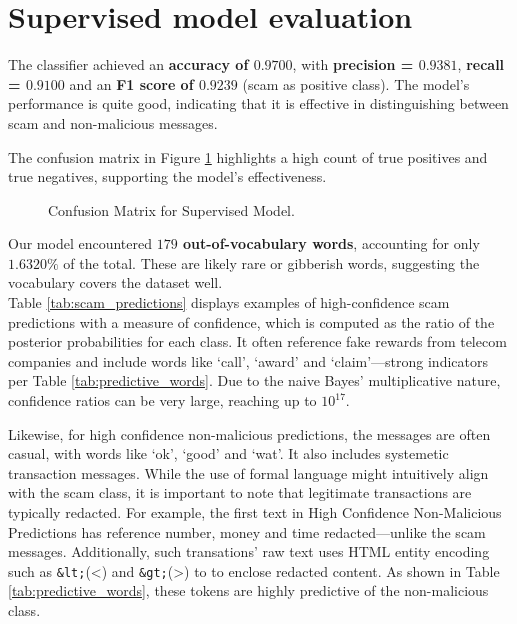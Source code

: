 \documentclass[a4paper,12pt]{article}
\begin{document}
\section{Supervised model evaluation}

The classifier achieved an \textbf{accuracy of $0.9700$}, with \textbf{precision = $0.9381$}, \textbf{recall = $0.9100$} and an \textbf{F1 score of $0.9239$} (scam as positive class). The model's performance is quite good, indicating that it is effective in distinguishing between scam and non-malicious messages.

The confusion matrix in Figure \ref{fig:base} highlights a high count of true positives and true negatives, supporting the model's effectiveness.

\begin{figure}[H]
    \centering
    
    \caption{Confusion Matrix for Supervised Model.}
    \label{fig:base}
\end{figure}

Our model encountered \textbf{$179$ out-of-vocabulary words}, accounting for only $1.6320\%$ of the total. These are likely rare or gibberish words, suggesting the vocabulary covers the dataset well. \\

Table \ref{tab:scam_predictions} displays examples of high-confidence scam predictions with a measure of confidence, which is computed as the ratio of the posterior probabilities for each class. It often reference fake rewards from telecom companies and include words like `call', `award' and `claim'—strong indicators per Table \ref{tab:predictive_words}. Due to the naive Bayes' multiplicative nature, confidence ratios can be very large, reaching up to $10^{17}$.

Likewise, for high confidence non-malicious predictions, the messages are often casual, with words like `ok', `good' and `wat'. It also includes systemetic transaction messages. While the use of formal language might intuitively align with the scam class, it is important to note that legitimate transactions are typically redacted. For example, the first text in High Confidence Non-Malicious Predictions has reference number, money and time redacted—unlike the scam messages. Additionally, such transations' raw text uses HTML entity encoding such as \texttt{\&lt;}(\textless) and \texttt{\&gt;}(\textgreater) to to enclose redacted content. As shown in Table \ref{tab:predictive_words}, these tokens are highly predictive of the non-malicious class.
\end{document}
